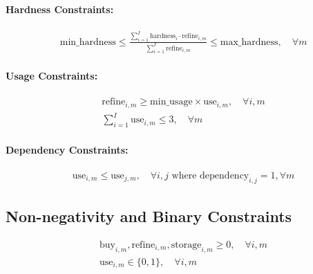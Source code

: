 \documentclass{article}
\begin{document}
\paragraph{Hardness Constraints:}
\begin{align*}
  & \text{min\_hardness} \leq \frac{\sum_{i=1}^{I} \text{hardness}_{i} \cdot \text{refine}_{i,m}}{\sum_{i=1}^{I} \text{refine}_{i,m}} \leq \text{max\_hardness}, \quad \forall m
\end{align*}

\paragraph{Usage Constraints:}
\begin{align*}
  & \text{refine}_{i,m} \geq \text{min\_usage} \times \text{use}_{i,m}, \quad \forall i, m \\
  & \sum_{i=1}^{I} \text{use}_{i,m} \leq 3, \quad \forall m
\end{align*}

\paragraph{Dependency Constraints:}
\begin{align*}
  & \text{use}_{i,m} \leq \text{use}_{j,m}, \quad \forall i, j \text{ where } \text{dependency}_{i,j} = 1, \forall m
\end{align*}

\subsection*{Non-negativity and Binary Constraints}
\begin{align*}
  & \text{buy}_{i,m}, \text{refine}_{i,m}, \text{storage}_{i,m} \geq 0, \quad \forall i, m \\
  & \text{use}_{i,m} \in \{0,1\}, \quad \forall i, m
\end{align*}
\end{document}
